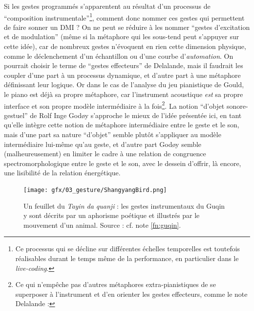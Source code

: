 \noindent Si les gestes programmés s'apparentent au résultat d'un processus de ``composition instrumentale''\footnote{Ce processus qui se décline sur différentes échelles temporelles est toutefois réalisables durant le temps même de la performance, en particulier dans le \textit{live-coding}.}, comment donc nommer ces gestes qui permettent de faire sonner un \gls{DMI} ? On ne peut se réduire à les nommer ``gestes d'excitation et de modulation'' (même si la métaphore qui les sous-tend peut s'appuyer sur cette idée), car de nombreux gestes n'évoquent en rien cette dimension physique, comme le déclenchement d'un échantillon ou d'une courbe d'\textit{automation}. On pourrait choisir le terme de ``gestes effecteurs'' de Delalande, mais il faudrait les coupler d'une part à un processus dynamique, et d'autre part à une métaphore définissant leur logique. Or dans le cas de l'analyse du jeu pianistique de Gould, le piano est déjà sa propre métaphore, car l'instrument acoustique \textit{est} sa propre interface et son propre modèle intermédiaire à la fois\footnote{Ce qui n'empêche pas d'autres métaphores extra-pianistiques de se superposer à l'instrument et d'en orienter les gestes effecteurs, comme le note Delalande : }. La notion ``d'objet sonore-gestuel'' de Rolf Inge Godøy s'approche le mieux de l'idée présentée ici, en tant qu'elle intègre cette notion de métaphore intermédiaire entre le geste et le son, mais d'une part sa nature ``d'objet'' semble plutôt s'appliquer au modèle intermédiaire lui-même qu'au geste, et d'autre part Godøy semble (malheureusement) en limiter le cadre à une relation de congruence spectromorphologique entre le geste et le son, avec le dessein d'offrir, là encore, une lisibilité de la relation énergétique.\\
\begin{figure}[!t]
	\captionsetup{format=plain}%
	\texttt{[image: gfx/03\_gesture/ShangyangBird.png]}
	\caption[Métaphore poétique et animale dans la pédagogie du Guqin]{Un feuillet du \textit{Tayin da quanji} : les gestes instrumentaux du Guqin y sont décrits par un aphorisme poétique et illustrés par le mouvement d'un animal. Source : cf. note \ref{fn:guqin}.}
	\label{fig:gesture:guqin}
\end{figure}
